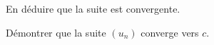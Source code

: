\documentclass[10pt,a4paper]{article}
\begin{document}
\q En déduire que la suite est convergente.

\q Démontrer que la suite \( (u_n) \) converge vers \( c \).
\end{document}
